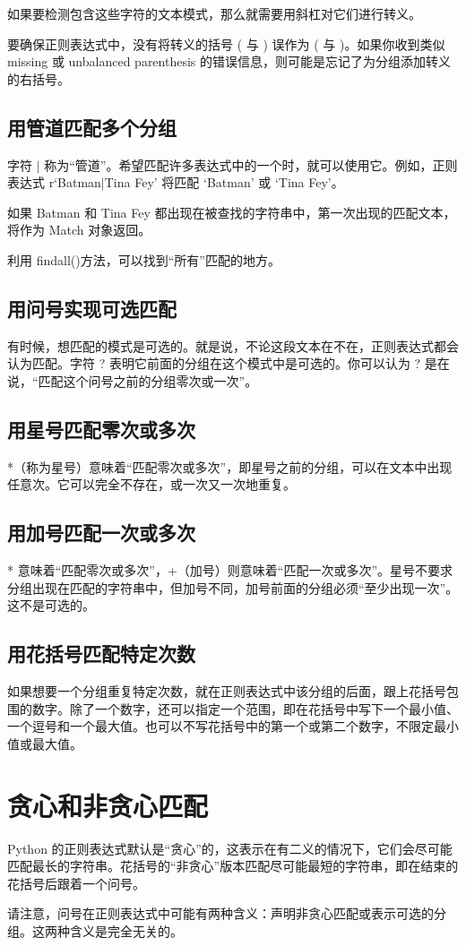 如果要检测包含这些字符的文本模式，那么就需要用斜杠对它们进行转义。

要确保正则表达式中，没有将转义的括号 ( 与 ) 误作为 ( 与 )。如果你收到类似 missing 或 unbalanced parenthesis 的错误信息，则可能是忘记了为分组添加转义的右括号。
\subsection{用管道匹配多个分组}
字符 $|$ 称为“管道”。希望匹配许多表达式中的一个时，就可以使用它。例如，正则表达式 r`Batman$|$Tina Fey' 将匹配 `Batman' 或 `Tina Fey'。

如果 Batman 和 Tina Fey 都出现在被查找的字符串中，第一次出现的匹配文本，将作为 Match 对象返回。

\begin{tcolorbox}
    利用 findall()方法，可以找到“所有”匹配的地方。
\end{tcolorbox}
\subsection{用问号实现可选匹配}
有时候，想匹配的模式是可选的。就是说，不论这段文本在不在，正则表达式都会认为匹配。字符 ? 表明它前面的分组在这个模式中是可选的。你可以认为 ? 是在说，“匹配这个问号之前的分组零次或一次”。
\subsection{用星号匹配零次或多次}
*（称为星号）意味着“匹配零次或多次”，即星号之前的分组，可以在文本中出现任意次。它可以完全不存在，或一次又一次地重复。
\subsection{用加号匹配一次或多次}
* 意味着“匹配零次或多次”，+（加号）则意味着“匹配一次或多次”。星号不要求分组出现在匹配的字符串中，但加号不同，加号前面的分组必须“至少出现一次”。这不是可选的。
\subsection{用花括号匹配特定次数}
如果想要一个分组重复特定次数，就在正则表达式中该分组的后面，跟上花括号包围的数字。除了一个数字，还可以指定一个范围，即在花括号中写下一个最小值、一个逗号和一个最大值。也可以不写花括号中的第一个或第二个数字，不限定最小值或最大值。
\section{贪心和非贪心匹配}
Python 的正则表达式默认是“贪心”的，这表示在有二义的情况下，它们会尽可能匹配最长的字符串。花括号的“非贪心”版本匹配尽可能最短的字符串，即在结束的花括号后跟着一个问号。

\begin{tcolorbox}
    请注意，问号在正则表达式中可能有两种含义：声明非贪心匹配或表示可选的分组。这两种含义是完全无关的。
\end{tcolorbox}